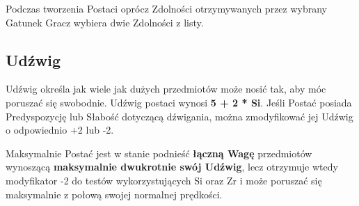 \documentclass[10pt,a4paper]{book}
\begin{document}
\begin{multicols}{2}
Podczas tworzenia Postaci oprócz Zdolności otrzymywanych przez wybrany Gatunek Gracz wybiera dwie Zdolności z listy.


\subsection*{Udźwig}
Udźwig określa jak wiele jak dużych przedmiotów może nosić tak, aby móc poruszać się swobodnie. Udźwig postaci wynosi \textbf{5 + 2 * Si}. Jeśli Postać posiada Predyspozycję lub Słabość dotyczącą dźwigania, można zmodyfikować jej Udźwig o odpowiednio +2 lub -2.

Maksymalnie Postać jest w stanie podnieść \textbf{łączną Wagę} przedmiotów wynoszącą \textbf{maksymalnie dwukrotnie swój Udźwig}, lecz otrzymuje wtedy modyfikator -2 do testów wykorzystujących Si oraz Zr i może poruszać się maksymalnie z połową swojej normalnej prędkości.


\end{multicols}
\end{document}
